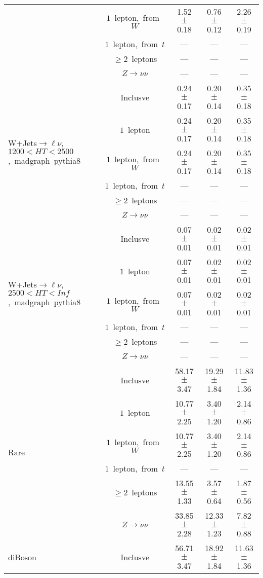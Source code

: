 \documentclass{article}
\begin{document}
\begin{longtable}{|l|c|c|c|c|}
 & $1$~lepton,~from~$W$  & 1.52 $\pm$ 0.18  & 0.76 $\pm$ 0.12  & 2.26 $\pm$ 0.19 \\* 
 & $1$~lepton,~from~$t$  & ---  & ---  & --- \\* 
 & $\ge2$~leptons  & ---  & ---  & --- \\* 
 & $Z\rightarrow\nu\nu$  & ---  & ---  & --- \\* 
\hline 
\multirow{6}{*}{W+Jets$\rightarrow\ell\nu$,~$1200<HT<2500$,~madgraph~pythia8} & Inclusve  & 0.24 $\pm$ 0.17  & 0.20 $\pm$ 0.14  & 0.35 $\pm$ 0.18 \\* 
 & $1$~lepton  & 0.24 $\pm$ 0.17  & 0.20 $\pm$ 0.14  & 0.35 $\pm$ 0.18 \\* 
 & $1$~lepton,~from~$W$  & 0.24 $\pm$ 0.17  & 0.20 $\pm$ 0.14  & 0.35 $\pm$ 0.18 \\* 
 & $1$~lepton,~from~$t$  & ---  & ---  & --- \\* 
 & $\ge2$~leptons  & ---  & ---  & --- \\* 
 & $Z\rightarrow\nu\nu$  & ---  & ---  & --- \\* 
\hline 
\multirow{6}{*}{W+Jets$\rightarrow\ell\nu$,~$2500<HT<Inf$,~madgraph~pythia8} & Inclusve  & 0.07 $\pm$ 0.01  & 0.02 $\pm$ 0.01  & 0.02 $\pm$ 0.01 \\* 
 & $1$~lepton  & 0.07 $\pm$ 0.01  & 0.02 $\pm$ 0.01  & 0.02 $\pm$ 0.01 \\* 
 & $1$~lepton,~from~$W$  & 0.07 $\pm$ 0.01  & 0.02 $\pm$ 0.01  & 0.02 $\pm$ 0.01 \\* 
 & $1$~lepton,~from~$t$  & ---  & ---  & --- \\* 
 & $\ge2$~leptons  & ---  & ---  & --- \\* 
 & $Z\rightarrow\nu\nu$  & ---  & ---  & --- \\* 
\hline 
\multirow{6}{*}{Rare} & Inclusve  & 58.17 $\pm$ 3.47  & 19.29 $\pm$ 1.84  & 11.83 $\pm$ 1.36 \\* 
 & $1$~lepton  & 10.77 $\pm$ 2.25  & 3.40 $\pm$ 1.20  & 2.14 $\pm$ 0.86 \\* 
 & $1$~lepton,~from~$W$  & 10.77 $\pm$ 2.25  & 3.40 $\pm$ 1.20  & 2.14 $\pm$ 0.86 \\* 
 & $1$~lepton,~from~$t$  & ---  & ---  & --- \\* 
 & $\ge2$~leptons  & 13.55 $\pm$ 1.33  & 3.57 $\pm$ 0.64  & 1.87 $\pm$ 0.56 \\* 
 & $Z\rightarrow\nu\nu$  & 33.85 $\pm$ 2.28  & 12.33 $\pm$ 1.23  & 7.82 $\pm$ 0.88 \\* 
\hline 
\multirow{6}{*}{diBoson} & Inclusve  & 56.71 $\pm$ 3.47  & 18.92 $\pm$ 1.84  & 11.63 $\pm$ 1.36 \\* 

\end{longtable}
\end{document}
